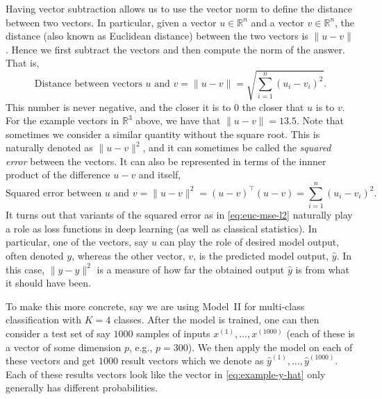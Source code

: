 \documentclass[12pt]{article}
\begin{document}
Having vector subtraction allows us to use the vector norm to define the distance between two vectors. In particular, given a vector $u \in {\mathbb R}^n$ and a vector $v \in {\mathbb R}^n$, the distance (also known as Euclidean distance) between the two vectors is $\|u-v\|$. Hence we first subtract the vectors and then compute the norm of the answer. That is,
%
\begin{equation}
\label{eq:euc-distance}
\textrm{Distance between vectors $u$ and $v$} =
\| u - v\| = \sqrt{\sum_{i=1}^n (u_i - v_i)^2}.
\end{equation}
%
This number is never negative, and the closer it is to $0$ the closer that $u$ is to $v$. For the example vectors in ${\mathbb R}^3$ above, we have that $\|u-v\| = 13.5$. Note that sometimes we consider a similar quantity without the square root. This is naturally denoted as $\|u-v\|^2$, and it can sometimes be called the {\em squared error} between the vectors. It can also be represented in terms of the innner product of the difference $u-v$ and itself,
%
\begin{equation}
\label{eq:euc-mse-l2}
\textrm{Squared error between $u$ and $v$} =
\| u - v\|^2 = (u-v)^\top(u-v) = \sum_{i=1}^n (u_i - v_i)^2.
\end{equation}
%
It turns out that variants of the squared error as in \eqref{eq:euc-mse-l2} naturally play a role as loss functions in deep learning (as well as classical statistics). In particular, one of the vectors, say $u$ can play the role of desired model output, often denoted $y$, whereas the other vector, $v$, is the predicted model output, $\hat{y}$. In this case, $\|y - \hat{y}\|^2$ is a measure of how far the obtained output $\hat{y}$ is from what it should have been. 

To make this more concrete, say we are using Model~II for multi-class classification with $K=4$ classes. After the model is trained, one can then consider a test set of say $1000$ samples of inputs $x^{(1)},\ldots,x^{(1000)}$ (each of these is a vector of some dimension $p$, e.g., $p=300$). We then apply the model on each of these vectors and get $1000$ result vectors which we denote as  $\hat{y}^{(1)}, \ldots, \hat{y}^{(1000)}$. Each of these results vectors look like the vector in \eqref{eq:example-y-hat} only generally has different probabilities.
\end{document}
